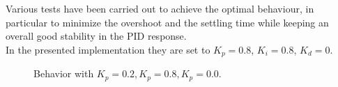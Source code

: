 \documentclass[11pt,a4paper]{article}
\begin{document}
Various tests have been carried out to achieve the optimal behaviour, in particular to minimize the overshoot and
the settling time while keeping an overall good stability in the PID response.\\

In the presented implementation they are set to $K_p = 0.8$, $K_i = 0.8$, $K_d = 0$.

\begin{figure}[H]
    \centering
    \caption[]{Behavior with $K_p=0.2, K_p=0.8, K_p=0.0$.}
\end{figure}
\end{document}
